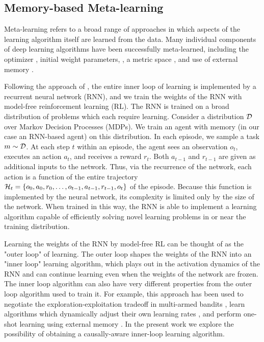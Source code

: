 \subsection{Memory-based Meta-learning}
\label{sec:meta-formalism}

Meta-learning refers to a broad range of approaches in which aspects of the learning algorithm itself are learned from the data. Many individual components of deep learning algorithms have been successfully meta-learned, including the optimizer \citep{andrychowicz2016learning}, initial weight parameters, \citep{finn2017model}, a metric space \citep{vinyals2016matching}, and use of external memory \citep{santoro2016meta}. 

Following the approach of \citep{duan2016RL2,wang2016}, the entire inner loop of learning is implemented by a recurrent neural network (RNN), and we train the weights of the RNN with model-free reinforcement learning (RL). The RNN is trained on a broad distribution of problems which each require learning. Consider a distribution ${\cal D}$ over Markov Decision Processes (MDPs). We train an agent with memory (in our case an RNN-based agent) on this distribution. In each episode, we sample a task $m\sim {\cal D}$. At each step $t$ within an episode, the agent sees an observation $o_t$, executes an action $a_t$, and receives a reward $r_t$. Both $a_{t-1}$ and $r_{t-1}$ are given as additional inputs to the network. Thus, via the recurrence of the network, each action is a function of the entire trajectory ${\cal H}_{t}=\{ o_0, a_0, r_0, \dots, o_{t-1}, a_{t-1}, r_{t-1}, o_t\}$ of the episode. Because this function is implemented by the neural network, its complexity is limited only by the size of the network. When trained in this way, the RNN is able to implement a learning algorithm capable of efficiently solving novel learning problems in or near the training distribution.

Learning the weights of the RNN by model-free RL can be thought of as the "outer loop" of learning. The outer loop shapes the weights of the RNN into an "inner loop" learning algorithm, which plays out in the activation dynamics of the RNN and can continue learning even when the weights of the network are frozen. The inner loop algorithm can also have very different properties from the outer loop algorithm used to train it. For example, this approach has been used to negotiate the exploration-exploitation tradeoff in multi-armed bandits \citep{duan2016RL2, wang2016}, learn algorithms which dynamically adjust their own learning rates \citep{wang2016,wang2018}, and perform one-shot learning using external memory \citep{santoro2016meta}. In the present work we explore the possibility of obtaining a causally-aware inner-loop learning algorithm.

